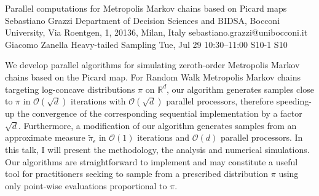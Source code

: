\documentclass[12pt,lettersize,oneside]{book} %
\begin{document}
\begin{talk}
  {Parallel computations for Metropolis Markov chains based on Picard maps}%
  {Sebastiano Grazzi}%
  {Department of Decision Sciences and BIDSA, Bocconi University, Via Roentgen, 1, 20136, Milan, Italy}%
  {sebastiano.grazzi@unibocconi.it}%
  {Giacomo Zanella}%
  {Heavy-tailed Sampling}%
  {Tue, Jul 29 10:30--11:00}%
  {S10-1}%
  {S10}%
    
   

 We develop parallel algorithms for simulating zeroth-order Metropolis Markov chains based on the Picard map. 
For Random Walk Metropolis Markov chains targeting log-concave distributions $\pi$ on $\mathbb{R}^d$, our algorithm  
generates samples %
close to $\pi$ %
in $\mathcal{O}(\sqrt{d})$ iterations with $\mathcal{O}(\sqrt{d})$ parallel processors, 
therefore speeding-up the convergence of the corresponding sequential implementation by a factor $\sqrt{d}$. Furthermore, a modification of our algorithm generates samples from an approximate measure $\tilde \pi_\epsilon$ in $\mathcal{O}(1)$ iterations and $\mathcal{O}(d)$ parallel processors. In this talk, I will present the methodology, the analysis and numerical simulations. Our algorithms are straightforward to implement and may constitute a useful tool for practitioners seeking to sample from a prescribed distribution $\pi$ using only point-wise evaluations proportional to $\pi$.
\end{talk}
\end{document}
